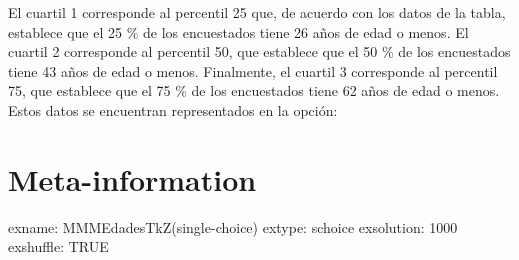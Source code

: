 \documentclass[
]{article}
\begin{document}
El cuartil 1 corresponde al percentil 25 que, de acuerdo con los datos
de la tabla, establece que el 25 \% de los encuestados tiene 26 años de
edad o menos. El cuartil 2 corresponde al percentil 50, que establece
que el 50 \% de los encuestados tiene 43 años de edad o menos.
Finalmente, el cuartil 3 corresponde al percentil 75, que establece que
el 75 \% de los encuestados tiene 62 años de edad o menos. Estos datos
se encuentran representados en la opción:


\hypertarget{meta-information}{%
\section{Meta-information}\label{meta-information}}

exname: MMMEdadesTkZ(single-choice) extype: schoice exsolution: 1000
exshuffle: TRUE
\end{document}

